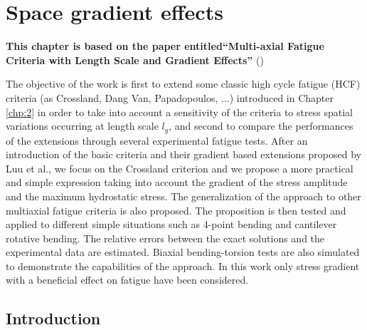 \chapter{Space gradient effects}\label{chp:3}
\minitoc

\vspace{6pt}
\textbf{This chapter is based on the paper entitled``Multi-axial Fatigue Criteria with Length Scale and Gradient Effects'' }(\cite{zepeng2015multi})
\vspace{6pt}

The objective of the work is first to extend some classic high cycle fatigue (HCF) criteria (as Crossland, Dang Van, Papadopoulos, ...) introduced in Chapter \ref{chp:2} in order  to take into account a sensitivity of the criteria to stress spatial variations occurring at length scale $l_g$, and second to compare the performances of the extensions through several experimental fatigue tests. After an introduction of the basic criteria and their gradient based extensions proposed by Luu et al., we focus on the Crossland criterion and we  propose a more practical and simple expression taking into account the gradient of the stress amplitude and the maximum hydrostatic stress. The generalization of the approach to other multiaxial fatigue criteria is also proposed.  The proposition is then tested and applied to different simple situations such as 4-point bending and cantilever rotative bending.  The relative errors between the exact solutions and the experimental data are estimated. Biaxial  bending-torsion tests are also simulated to demonstrate the capabilities of the approach.  In this work only stress gradient with a beneficial effect on fatigue have been considered. 

\section{Introduction}

